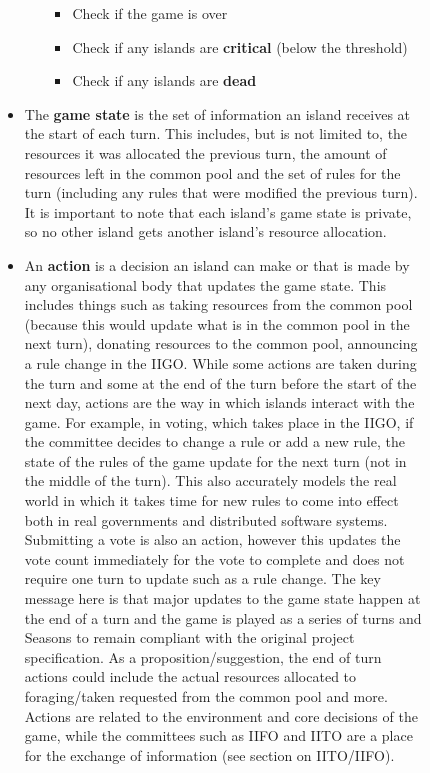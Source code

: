 \begin{figure}[!htb]
\begin{itemize}
\begin{enumerate}
\begin{itemize}
                        \item Check if the game is over
                        \item Check if any islands are \textbf{critical} (below the threshold)
                        \item Check if any islands are \textbf{dead}
                    \end{itemize}
            \end{enumerate}        
        \item The \textbf{game state} is the set of information an island receives at the start of each turn. This includes, but is not limited to, the resources it was allocated the previous turn, the amount of resources left in the common pool and the set of rules for the turn (including any rules that were modified the previous turn). It is important to note that each island's game state is private, so no other island gets another island's resource allocation. 
        \item An \textbf{action} is a decision an island can make or that is made by any organisational body that updates the game state. This includes things such as taking resources from the common pool (because this would update what is in the common pool in the next turn), donating resources to the common pool, announcing a rule change in the IIGO. While some actions are taken during the turn and some at the end of the turn before the start of the next day, actions are the way in which islands interact with the game. For example, in voting, which takes place in the IIGO, if the committee decides to change a rule or add a new rule, the state of the rules of the game update for the next turn (not in the middle of the turn). This also accurately models the real world in which it takes time for new rules to come into effect both in real governments and distributed software systems. Submitting a vote is also an action, however this updates the vote count immediately for the vote to complete and does not require one turn to update such as a rule change. The key message here is that major updates to the game state happen at the end of a turn and the game is played as a series of turns and Seasons to remain compliant with the original project specification. As a proposition/suggestion, the end of turn actions could include the actual resources allocated to foraging/taken requested from the common pool and more. Actions are related to the environment and core decisions of the game, while the committees such as IIFO and IITO are a place for the exchange of information (see section on IITO/IIFO).

\end{itemize}
\end{figure}
